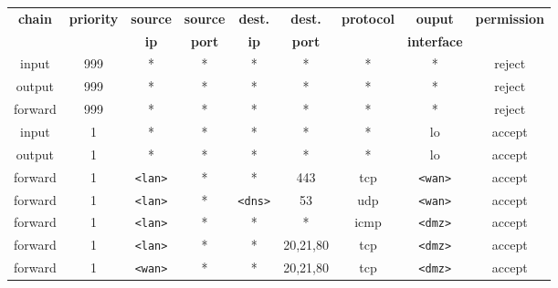 \documentclass[a4paper]{article}
\begin{document}
\begin{itemize}
\begin{center}
\begin{tabular}{|c|c|c|c|c|c|c|c|c|}
    \textbf{chain} & \textbf{priority} &
    \textbf{source} & \textbf{source} & \textbf{dest.} & \textbf{dest.} &
    \textbf{protocol} & \textbf{ouput} & \textbf{permission} \\

    && \textbf{ip} & \textbf{port} & \textbf{ip} & \textbf{port} &
    & \textbf{interface} & \\ \hline \hline


    input & 999 &
    * & * & * & * &
    * & * & reject \\ \hline

    output & 999 &
    * & * & * & * &
    * & * & reject \\ \hline

    forward & 999 &
    * & * & * & * &
    * & * & reject \\ \hline \hline


    input & 1 &
    * & * & * & * &
    * & lo & accept \\ \hline

    output & 1 &
    * & * & * & * &
    * & lo & accept \\ \hline \hline


    forward & 1 &
    \texttt{<lan>} & * & * & 443 &
    tcp & \texttt{<wan>} & accept \\ \hline

    forward & 1 &
    \texttt{<lan>} & * & \texttt{<dns>} & 53 &
    udp & \texttt{<wan>} & accept \\ \hline \hline


    forward & 1 &
    \texttt{<lan>} & * & * & * &
    icmp & \texttt{<dmz>} & accept \\ \hline

    forward & 1 &
    \texttt{<lan>} & * & * & 20,21,80 &
    tcp & \texttt{<dmz>} & accept \\ \hline \hline


    forward & 1 &
    \texttt{<wan>} & * & * & 20,21,80 &
    tcp & \texttt{<dmz>} & accept \\ \hline


\end{tabular}
\end{center}
\end{itemize}
\end{document}
